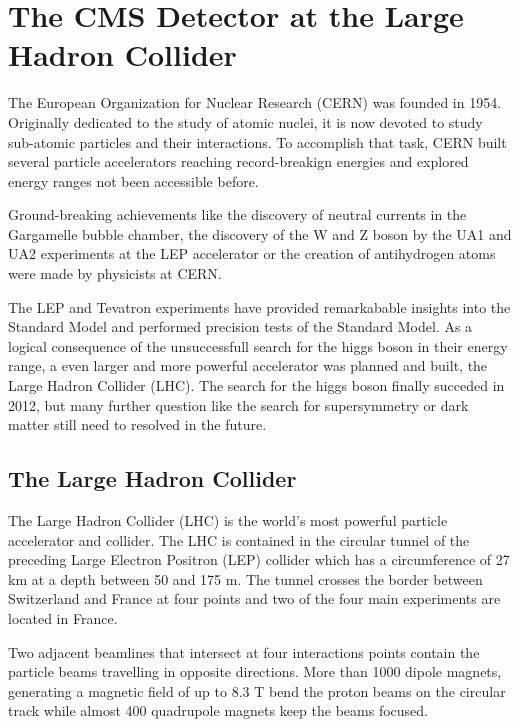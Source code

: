 
\chapter{The CMS Detector at the Large Hadron Collider}

The European Organization for Nuclear Research (CERN) was founded in 1954.
Originally dedicated to the study of atomic nuclei, it is now devoted to
study sub-atomic particles and their interactions. To accomplish that task, CERN
built several particle accelerators reaching record-breakign energies and
explored energy ranges not been accessible before.


Ground-breaking achievements like the discovery of neutral currents in the
Gargamelle bubble chamber, the discovery of the W and Z boson by the UA1 and UA2
experiments at the LEP accelerator or the creation of antihydrogen atoms were
made by physicists at CERN.



The LEP and Tevatron experiments have provided remarkabable insights into the
Standard Model and performed precision tests of the Standard Model. As a logical
consequence of the unsuccessfull search for the higgs boson in their energy
range, a even larger and more powerful accelerator was planned and built, the
Large Hadron Collider (LHC). The search for the higgs boson finally succeded in
2012, but many further question like the search for supersymmetry or dark matter
still need to resolved in the future.

\section{The Large Hadron Collider}

The Large Hadron Collider (LHC) is the world's most powerful particle
accelerator and collider. The LHC is contained in the circular tunnel of the
preceding Large Electron Positron (LEP) collider which has a circumference of 27
km at a depth between 50 and 175 m. The tunnel crosses the border between
Switzerland and France at four points and two of the four main experiments are
located in France. 

Two adjacent beamlines that intersect at four interactions points contain the
particle beams travelling in opposite directions. More than 1000 dipole magnets,
generating a magnetic field of up to 8.3 T bend the proton beams on the circular track while
almost 400 quadrupole magnets keep the beams focused. 

